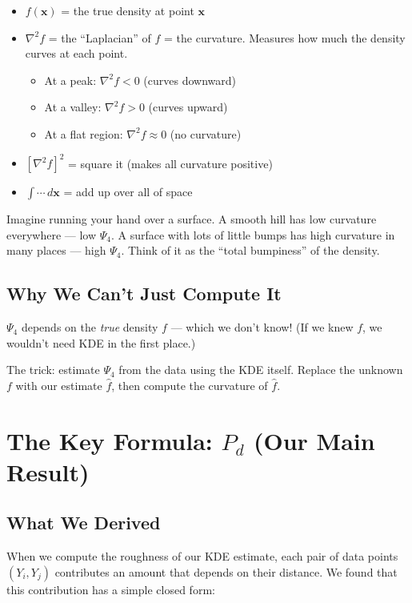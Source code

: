 \documentclass[12pt]{article}
\newcommand{\analogy}[1]{\begin{tcolorbox}[colback=green!5,colframe=green!50!black,title=Analogy]\small #1\end{tcolorbox}}
\newcommand{\step}[1]{\begin{tcolorbox}[colback=blue!5,colframe=blue!50!black,title=Step-by-Step]\small #1\end{tcolorbox}}
\begin{document}
\step{
\begin{itemize}
\item $f(\mathbf{x})$ = the true density at point $\mathbf{x}$
\item $\nabla^2 f$ = the ``Laplacian'' of $f$ = the curvature. Measures how much the density curves at each point.
\begin{itemize}
    \item At a peak: $\nabla^2 f < 0$ (curves downward)
    \item At a valley: $\nabla^2 f > 0$ (curves upward)
    \item At a flat region: $\nabla^2 f \approx 0$ (no curvature)
\end{itemize}
\item $[\nabla^2 f]^2$ = square it (makes all curvature positive)
\item $\int \cdots\, d\mathbf{x}$ = add up over all of space
\end{itemize}
}

\analogy{Imagine running your hand over a surface. A smooth hill has low curvature everywhere --- low $\Psi_4$. A surface with lots of little bumps has high curvature in many places --- high $\Psi_4$. Think of it as the ``total bumpiness'' of the density.}

\subsection{Why We Can't Just Compute It}

$\Psi_4$ depends on the \emph{true} density $f$ --- which we don't know! (If we knew $f$, we wouldn't need KDE in the first place.)

The trick: estimate $\Psi_4$ from the data using the KDE itself. Replace the unknown $f$ with our estimate $\hat{f}$, then compute the curvature of $\hat{f}$.

\section{The Key Formula: $P_d$ (Our Main Result)}

\subsection{What We Derived}

When we compute the roughness of our KDE estimate, each pair of data points $(Y_i, Y_j)$ contributes an amount that depends on their distance. We found that this contribution has a simple closed form:
\end{document}
